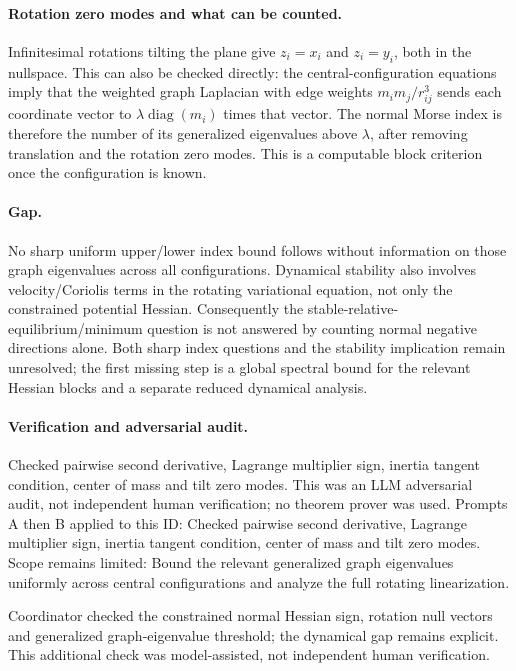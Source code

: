 \documentclass[11pt]{article}
\begin{document}
\paragraph{Rotation zero modes and what can be counted.}Infinitesimal rotations tilting the plane give \(z_i=x_i\) and \(z_i=y_i\), both in the nullspace. This can also be checked directly: the central-configuration equations imply that the weighted graph Laplacian with edge weights \(m_im_j/r_{ij}^3\) sends each coordinate vector to \(\lambda\operatorname{diag}(m_i)\) times that vector. The normal Morse index is therefore the number of its generalized eigenvalues above \(\lambda\), after removing translation and the rotation zero modes. This is a computable block criterion once the configuration is known.
\paragraph{Gap.}No sharp uniform upper/lower index bound follows without information on those graph eigenvalues across all configurations. Dynamical stability also involves velocity/Coriolis terms in the rotating variational equation, not only the constrained potential Hessian. Consequently the stable-relative-equilibrium/minimum question is not answered by counting normal negative directions alone. Both sharp index questions and the stability implication remain unresolved; the first missing step is a global spectral bound for the relevant Hessian blocks and a separate reduced dynamical analysis.

\paragraph{Verification and adversarial audit.}
Checked pairwise second derivative, Lagrange multiplier sign, inertia tangent condition, center of mass and tilt zero modes. This was an LLM adversarial audit, not independent human verification; no theorem prover was used. Prompts A then B applied to this ID: Checked pairwise second derivative, Lagrange multiplier sign, inertia tangent condition, center of mass and tilt zero modes. Scope remains limited: Bound the relevant generalized graph eigenvalues uniformly across central configurations and analyze the full rotating linearization.

Coordinator checked the constrained normal Hessian sign, rotation null vectors and generalized graph-eigenvalue threshold; the dynamical gap remains explicit. This additional check was model-assisted, not independent human verification.
\end{document}
